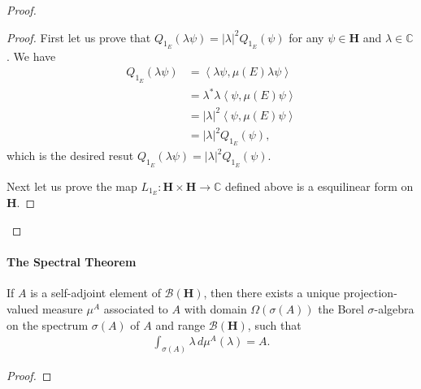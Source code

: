 \begin{proof}
\begin{proof}
        First let us prove that $Q_{1_E}(\lambda\psi) = |\lambda|^2 Q_{1_E}(\psi)$ for any $\psi \in \mathbf{H}$ and $\lambda \in \mathbb{C}$. We have
        \begin{align}
            Q_{1_E}(\lambda\psi) &= \left< \lambda \psi, \mu(E) \lambda \psi \right> \\
                                 &= \lambda^* \lambda \left< \psi, \mu(E) \psi \right> \\
                                 &= |\lambda|^2 \left< \psi, \mu(E) \psi \right> \\
                                 &= |\lambda|^2 Q_{1_E}(\psi),
        \end{align}
        which is the desired resut $Q_{1_E}(\lambda\psi) = |\lambda|^2 Q_{1_E}(\psi)$.

        Next let us prove the map $L_{1_E} : \mathbf{H} \times \mathbf{H} \rightarrow \mathbb{C}$ defined above is a esquilinear form on $\mathbf{H}$.

    \end{proof}

\end{proof}

\paragraph{The Spectral Theorem}

\begin{theorem}
    \label{thrm:spectral-theorem-for-bounded-self-adjoint-operator}
    If $A$ is a self-adjoint element of $\mathcal{B}(\mathbf{H})$, then there exists a unique projection-valued measure $\mu^A$ associated to $A$ with domain $\Omega(\sigma(A))$ the Borel $\sigma$-algebra on the spectrum $\sigma(A)$ of $A$ and range $\mathcal{B}(\mathbf{H})$, such that
    \begin{align}
        \int_{\sigma(A)} \lambda \, d\mu^A(\lambda) = A.
    \end{align}
\end{theorem}

\begin{proof}
\end{proof}


